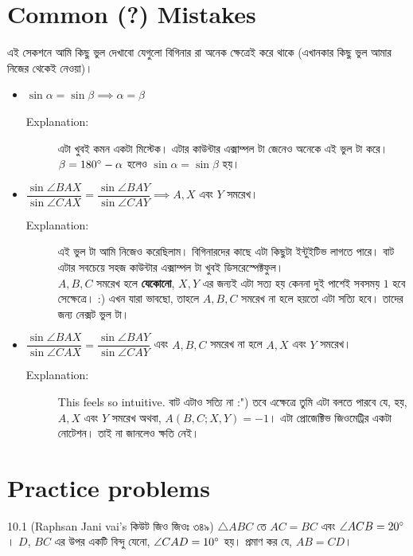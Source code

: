 \documentclass[12pt]{article}
\begin{document}
\section{Common (?) Mistakes}
এই সেকশনে আমি কিছু ভুল দেখাবো যেগুলো বিগিনার রা অনেক ক্ষেত্রেই করে থাকে (এখানকার কিছু ভুল 
আমার নিজের থেকেই নেওয়া)। 
\begin{itemize}
    \item $\sin \alpha = \sin \beta \implies \alpha = \beta$
    \begin{description}
        \item[Explanation:] এটা খুবই কমন একটা মিস্টেক। এটার কাউন্টার এক্সাম্পল টা 
        জেনেও অনেকে এই ভুল টা করে। $\beta = 180^\circ - \alpha$ 
        হলেও $\sin \alpha = \sin \beta$ হয়।
    \end{description}
    \item $\dfrac{\sin\angle BAX}{\sin\angle CAX} = \dfrac{\sin\angle BAY}{\sin\angle CAY}
        \implies A, X$ এবং $Y$ সমরেখ। 
    \begin{description}
        \item[Explanation:] এই ভুল টা আমি নিজেও করেছিলাম। বিগিনারদের কাছে এটা কিছুটা 
            ইন্টুইটিভ লাগতে পারে। বাট এটার সবচেয়ে সহজ কাউন্টার এক্সাম্পল টা খুবই ডিসরেস্পেক্টফুল।\\
            $A, B, C$ সমরেখ হলে \textbf{যেকোনো}, $X,Y$ এর জন্যই এটা সত্য হয় কেননা 
            দুই পাশেই সবসময় $1$ হবে সেক্ষেত্রে। :) এখন যারা ভাবছো, তাহলে $A, B, C$ সমরেখ না হলে 
            হয়তো এটা সত্যি হবে। তাদের জন্য নেক্সট ভুল টা।
    \end{description}
    \item $\dfrac{\sin\angle BAX}{\sin\angle CAX} = \dfrac{\sin\angle BAY}{\sin\angle CAY}$ 
        এবং $A, B, C$ সমরেখ না হলে $A, X$ এবং $Y$ সমরেখ। 
    \begin{description}
        \item[Explanation:] This feels so intuitive. বাট এটাও সত্যি না :") 
            তবে এক্ষেত্রে তুমি এটা বলতে পারবে যে, হয়, $A, X$ এবং $Y$ সমরেখ অথবা,
            $A(B,C;X,Y) = -1$। এটা প্রোজেক্টিভ জিওমেট্রির একটা নোটেশন। তাই না জানলেও 
            ক্ষতি নেই।
    \end{description}
\end{itemize}



\section{Practice problems}
\begin{prob} {10.1 (Raphsan Jani vai's কিউট জিও জিওঃ ৩৪৯)}
    $\triangle ABC$ তে $AC = BC$ এবং $\angle ACB = 20^\circ$। $D$, $BC$ এর উপর একটি বিন্দু যেনো, 
    $\angle CAD = 10^\circ$ হয়। প্রমাণ কর যে, $AB = CD$। 
\end{prob}
\end{document}
